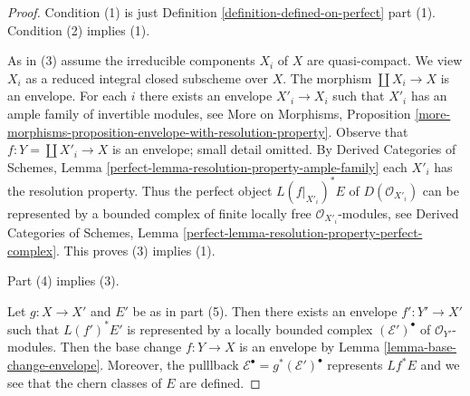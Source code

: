 \documentclass[10pt,a4paper]{amsart}
\theoremstyle{plain}
\theoremstyle{definition}
\theoremstyle{remark}
\numberwithin{equation}{subsection}
\begin{document}
\begin{proof}
Condition (1) is just Definition \ref{definition-defined-on-perfect} part (1).
Condition (2) implies (1).

\medskip\noindent
As in (3) assume the irreducible components $X_i$ of $X$ are quasi-compact.
We view $X_i$ as a reduced integral closed subscheme over $X$.
The morphism $\coprod X_i \to X$ is an envelope. For each $i$ there
exists an envelope $X'_i \to X_i$ such that $X'_i$ has an ample family
of invertible modules, see More on Morphisms, Proposition
\ref{more-morphisms-proposition-envelope-with-resolution-property}.
Observe that $f : Y = \coprod X'_i \to X$ is an envelope; small detail omitted.
By Derived Categories of Schemes, Lemma
\ref{perfect-lemma-resolution-property-ample-family}
each $X'_i$ has the resolution property.
Thus the perfect object $L(f|_{X'_i})^*E$ of $D(\mathcal{O}_{X'_i})$
can be represented by a bounded
complex of finite locally free $\mathcal{O}_{X'_i}$-modules, see
Derived Categories of Schemes, Lemma
\ref{perfect-lemma-resolution-property-perfect-complex}.
This proves (3) implies (1).

\medskip\noindent
Part (4) implies (3).

\medskip\noindent
Let $g : X \to X'$ and $E'$ be as in part (5). Then there exists an
envelope $f' : Y' \to X'$ such that $L(f')^*E'$ is represented by a
locally bounded complex $(\mathcal{E}')^\bullet$ of $\mathcal{O}_{Y'}$-modules.
Then the base change $f : Y \to X$ is an envelope by
Lemma \ref{lemma-base-change-envelope}. Moreover, the pulllback
$\mathcal{E}^\bullet = g^*(\mathcal{E}')^\bullet$ represents $Lf^*E$
and we see that the chern classes of $E$ are defined.
\end{proof}
\end{document}
